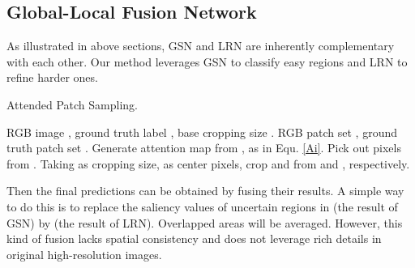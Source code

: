 \documentclass[10pt,twocolumn,letterpaper]{article}
\begin{document}
\subsection{Global-Local Fusion Network}\label{44}

As illustrated in above sections, GSN and LRN are inherently complementary with each other. Our method leverages GSN to classify easy regions and LRN to refine harder ones.
\begin{algorithm}[t]
\caption{Attended Patch Sampling.}
\begin{algorithmic}[1]
\label{alg:crop}
\REQUIRE RGB image , ground truth label , base cropping size .
\ENSURE RGB patch set , ground truth patch set .
\STATE Generate attention map  from , as in Equ. \ref{Ai}.\STATE \FOR {}
\STATE 
\STATE \STATE 
\STATE Pick out  pixels  from .
\STATE Taking  as cropping size,  as center pixels, crop  and  from  and , respectively.
\ENDFOR
\end{algorithmic}
\end{algorithm}
Then the final predictions can be obtained by fusing their results. A simple way to do this is to replace the saliency values of uncertain regions in  (the result of GSN) by  (the result of LRN). Overlapped areas will be averaged. However, this kind of fusion lacks spatial consistency and does not leverage rich details in original high-resolution images.   
\end{document}
